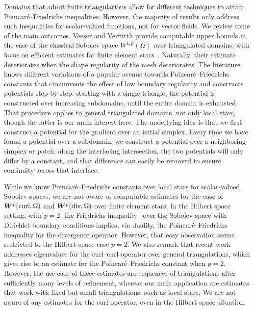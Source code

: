 \documentclass[10pt,a4paper]{article}
\begin{document}
Domains that admit finite triangulations allow for different techniques to attain Poincar\'e--Friedrichs inequalities. 
However, the majority of results only address such inequalities for scalar-valued functions, not for vector fields. 
We review some of the main outcomes. 
Veeser and Verf\"urth provide computable upper bounds in the case of the classical Sobolev space $W^{1,p}(\Omega)$ over triangulated domains, with focus on efficient estimates for finite element stars~\cite{veeser2012poincare}. Naturally, their estimate deteriorates when the shape regularity of the mesh deteriorates. 
% 
The literature~\cite{Eym_Gal_Her_00,vohralik2005discrete,ern2020stable,ern2021finite,Chaum_Voh_p_rob_3D_H_curl_23,Voh_loc_glob_H1_24} knows different variations of a popular avenue towards Poincar\'e--Friedrichs constants that circumvents the effect of low boundary regularity and constructs potentials step-by-step: 
starting with a single triangle, the potential is constructed over increasing subdomains, until the entire domain is exhausted. That procedure applies to general triangulated domains, not only local stars, though the latter is our main interest here. 
The underlying idea is that we first construct a potential for the gradient over an initial simplex. 
Every time we have found a potential over a subdomain, we construct a potential over a neighboring simplex or patch:
along the interfacing intersection, the two potentials will only differ by a constant, 
and that difference can easily be removed to ensure continuity across that interface. 

While we know Poincar\'e--Friedrichs constants over local stars for scalar-valued Sobolev spaces, 
we are not aware of computable estimates for the case of $\bm{W}^{p}(\operatorname{curl},\Omega)$ and $\bm{W}^{p}(\operatorname{div},\Omega)$ over finite element stars. 
In the Hilbert space setting, with $p=2$, the Friedrichs inequality~\cite{burenkov1998sobolev} over the Sobolev space with Dirichlet boundary conditions implies, 
via duality, the Poincar\'e--Friedrichs inequality for the divergence operator. However, that easy observation seems restricted to the Hilbert space case $p=2$. 
We also remark that recent work~\cite{gallistl2023computational} addresses eigenvalues for the curl--curl operator over general triangulations,
which gives rise to an estimate for the Poincar\'e--Friedrichs constant when $p=2$. However, the use case of these estimates are sequences of triangulations after sufficiently many levels of refinement, whereas our main application are estimates that work with fixed but small triangulations, such as local stars. 
We are not aware of any estimates for the curl operator, even in the Hilbert space situation. 
\end{document}
